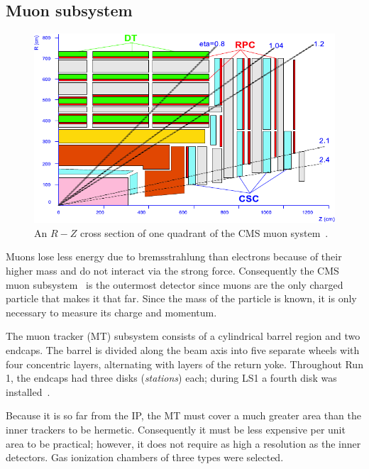 \subsection{Muon subsystem}
\begin{figure}[htb]
  \includegraphics[width=\textwidth]{figures/muon_quadrant}
  \caption[Cross section of one quadrant of the CMS muon system]{An $R-Z$ cross section of one quadrant of the CMS muon system~\cite{cms-tdr-1}.}
  \label{fig:muonquadrant}
\end{figure}
Muons lose less energy due to bremsstrahlung than electrons because of their
higher mass and do not interact via the strong force. Consequently the CMS muon
subsystem~\cite{muonTDR} is the outermost detector since muons are the only
charged particle that makes it that far. Since the mass of the particle is
known, it is only necessary to measure its charge and momentum.

The muon tracker (MT) subsystem consists of a cylindrical barrel region and two
endcaps. The barrel is divided along the beam axis into five separate wheels
with four concentric layers, alternating with layers of the return yoke.
Throughout Run 1, the endcaps had three disks (\textit{stations}) each; during
LS1 a fourth disk was installed~\cite{Guiducci:1966038}.

Because it is so far from the IP, the MT must cover a much greater area than the
inner trackers to be hermetic. Consequently it must be less expensive per unit
area to be practical; however, it does not require as high a resolution as the
inner detectors. Gas ionization chambers of three types were selected.

